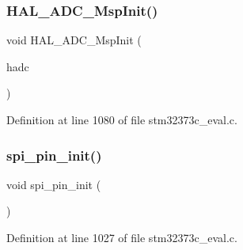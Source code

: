 \subsubsection{H\+A\+L\+\_\+\+A\+D\+C\+\_\+\+Msp\+Init()}
{\footnotesize\ttfamily void H\+A\+L\+\_\+\+A\+D\+C\+\_\+\+Msp\+Init (\begin{DoxyParamCaption}\item[{A\+D\+C\+\_\+\+Handle\+Type\+Def $\ast$}]{hadc }\end{DoxyParamCaption})}



Definition at line 1080 of file stm32373c\+\_\+eval.\+c.

\mbox{\label{group___private___functions_ga54b202c3155e9bfad50566d2a184e310}} 
\subsubsection{spi\+\_\+pin\+\_\+init()}
{\footnotesize\ttfamily void spi\+\_\+pin\+\_\+init (\begin{DoxyParamCaption}\item[{void}]{ }\end{DoxyParamCaption})}



Definition at line 1027 of file stm32373c\+\_\+eval.\+c.

